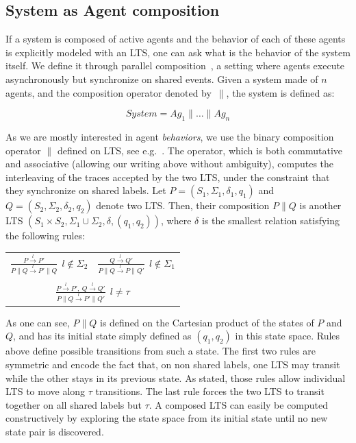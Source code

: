 \subsection{System as Agent composition}

If a system is composed of active agents and the behavior of each of these agents is explicitly modeled with an LTS, one can ask what is the behavior of the system itself. We define it through parallel composition~\cite{Hoare:1985}, a setting where agents execute asynchronously but synchronize on shared events. Given a system made of $n$ agents, and the composition operator denoted by~$\parallel$, the system is defined as:

\begin{equation}
System = Ag_1 \parallel \ldots \parallel Ag_n
\end{equation}

As we are mostly interested in agent \emph{behaviors}, we use the binary composition operator $\parallel$ defined on LTS, see e.g.~\cite{Giannakopoulou:1999, Magee:1999}. The operator, which is both commutative and associative (allowing our writing above without ambiguity), computes the interleaving of the traces accepted by the two LTS, under the constraint that they synchronize on shared labels. Let $P = (S_1,\Sigma_1,\delta_1,q_{1})$ and $Q = (S_2,\Sigma_2,\delta_2,q_{2})$ denote two LTS. Then, their composition $P \parallel Q$ is another LTS $(S_1 \times S_2,\Sigma_1\cup\Sigma_2,\delta,(q_1,q_2))$, where $\delta$ is the smallest relation satisfying the following rules:

\begin{center}
\begin{tabular}{cc}
$\frac{\displaystyle P \stackrel{l}{\longrightarrow} P'}{\displaystyle P \parallel Q \stackrel{l}{\longrightarrow} P' \parallel Q}~~l \notin \Sigma_2$ &
$\frac{\displaystyle Q \stackrel{l}{\longrightarrow} Q'}{\displaystyle P \parallel Q \stackrel{l}{\longrightarrow} P \parallel Q'}~~l \notin \Sigma_1$ \\
 & \\
\multicolumn{2}{c}{$\frac{\displaystyle P \stackrel{l}{\longrightarrow} P',~Q \stackrel{l}{\longrightarrow} Q'}{\displaystyle P \parallel Q \stackrel{l}{\longrightarrow} P' \parallel Q'}~~l \neq \tau$} \\
\end{tabular}
\end{center}

As one can see, $P \parallel Q$ is defined on the Cartesian product of the states of $P$ and $Q$, and has its initial state simply defined as $(q_1,q_2)$ in this state space. Rules above define possible transitions from such a state. The first two rules are symmetric and encode the fact that, on non shared labels, one LTS may transit while the other stays in its previous state. As stated, those rules allow individual LTS to move along $\tau$ transitions. The last rule forces the two LTS to transit together on all shared labels but $\tau$. A composed LTS can easily be computed constructively by exploring the state space from its initial state until no new state pair is discovered. 

